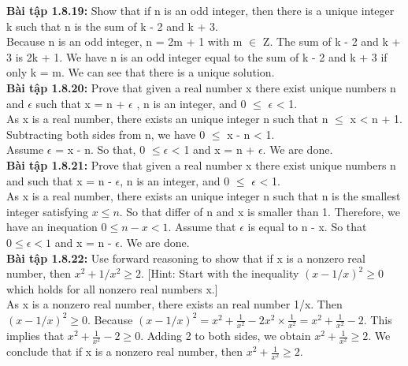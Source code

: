 \documentclass[a4paper]{article}
\begin{document}
\begin{enumerate}
\textbf{Bài tập 1.8.19:} Show that if n is an odd integer, then there is a unique integer k such that n is the sum of k - 2 and k + 3.\\
Because n is an odd integer, n = 2m + 1 with m $\in$ Z. The sum of  k - 2 and k + 3 is 2k + 1. We have n is an odd integer equal to the sum of k - 2 and k + 3 if only k = m. We can see that there is a unique solution.\\

\textbf{Bài tập 1.8.20:} Prove that given a real number x there exist unique numbers n and $\epsilon$ such that x = n + $\epsilon$ , n is an integer, and 0 $\le$ $\epsilon$ < 1.\\
As x is a real number, there exists an unique integer n such that n $\le$ x < n + 1. Subtracting both sides from n, we have 0 $\le$ x - n < 1.\\
Assume $\epsilon$ = x - n. So that, 0 $\le \epsilon$ < 1 and x = n + $\epsilon$. We are done.\\

\textbf{Bài tập 1.8.21:} Prove that given a real number x there exist unique numbers n and  such that x = n - $\epsilon$, n is an integer, and 0 $\le$ $\epsilon$ < 1.\\
As x is a real number, there exists an unique integer n such that n is the smallest integer satisfying $x \le n$. So that differ of n and x is smaller than 1. Therefore, we have an inequation $0 \le n-x < 1$. Assume that $\epsilon$ is equal to n - x. So that $0 \le \epsilon < 1$ and x = n - $\epsilon$. We are done.\\

\textbf{Bài tập 1.8.22:} Use forward reasoning to show that if x is a nonzero real number, then $x^{2} + 1/x^{2} \ge 2$. [Hint: Start with the inequality $(x - 1/x)^{2} \ge 0$ which holds for all nonzero real numbers x.]\\
As x is a nonzero real number, there exists an real number 1/x. Then $(x - 1/x)^{2} \ge 0$. Because  $(x - 1/x)^{2} = x^{2} + \frac{1}{x^{2}} - 2x^{2} \times \frac{1}{x^{2}} =  x^{2} + \frac{1}{x^{2}} - 2$. This implies that $x^{2} + \frac{1}{x^{2}} -2 \ge 0$. Adding 2 to both sides, we obtain $x^{2} + \frac{1}{x^{2}} \ge 2$. We conclude that if x is a nonzero real number, then $x^{2} + \frac{1}{x^{2}} \ge 2$.\\


\end{enumerate}
\end{document}
